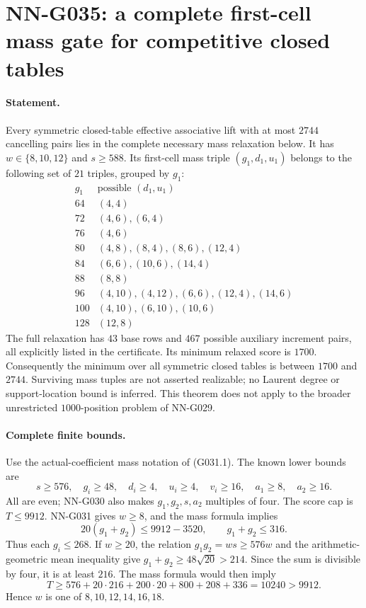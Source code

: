 \section{NN-G035: a complete first-cell mass gate for competitive closed tables}
\paragraph{Statement.}
Every symmetric closed-table effective associative lift with
at most $2744$ cancelling pairs lies in the complete necessary
mass relaxation below. It has $w\in\{8,10,12\}$ and $s\ge588$.
Its first-cell mass triple $(g_1,d_1,u_1)$ belongs to the
following set of $21$ triples, grouped by $g_1$:
\[
\begin{array}{c|l}
 g_1&\text{possible }(d_1,u_1)\\\hline
 64&(4,4)\\
 72&(4,6),(6,4)\\
 76&(4,6)\\
 80&(4,8),(8,4),(8,6),(12,4)\\
 84&(6,6),(10,6),(14,4)\\
 88&(8,8)\\
 96&(4,10),(4,12),(6,6),(12,4),(14,6)\\
 100&(4,10),(6,10),(10,6)\\
 128&(12,8)
\end{array}                                                         \tag{G035.1}
\]
The full relaxation has $43$ base rows and $467$ possible
auxiliary increment pairs, all explicitly listed in the
certificate. Its minimum relaxed score is $1700$.
Consequently the minimum over all symmetric closed tables
is between $1700$ and $2744$.
Surviving mass tuples are not asserted realizable; no
Laurent degree or support-location bound is inferred.
This theorem does not apply to the broader unrestricted
$1000$-position problem of NN-G029.

\paragraph{Complete finite bounds.}
Use the actual-coefficient mass notation of (G031.1).
The known lower bounds are
\[
 s\ge576,\quad g_i\ge48,\quad d_i\ge4,\quad
 u_i\ge4,\quad v_i\ge16,\quad a_1\ge8,\quad a_2\ge16.
\]
All are even; NN-G030 also makes $g_1,g_2,s,a_2$
multiples of four. The score cap is $T\le9912$.
NN-G031 gives $w\ge8$, and the mass formula implies
\[
              20(g_1+g_2)\le9912-3520,
              \qquad g_1+g_2\le316.                 \tag{G035.2}
\]
Thus each $g_i\le268$.
If $w\ge20$, the relation $g_1g_2=ws\ge576w$
and the arithmetic-geometric mean inequality give
$g_1+g_2\ge48\sqrt{20}>214$.
Since the sum is divisible by four, it is at least
$216$. The mass formula would then imply
\[
 T\ge576+20\cdot216+200\cdot20+800+208+336
       =10240>9912.
\]
Hence $w$ is one of $8,10,12,14,16,18$.

